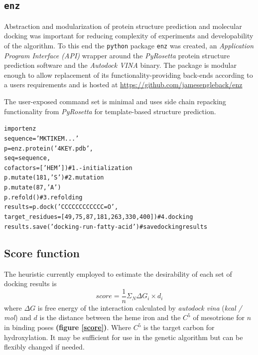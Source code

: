 \documentclass[16pt]{article}
\begin{document}
\subsection{\texttt{enz} \label{enz}}

Abstraction and modularization of protein structure prediction and molecular docking was important for reducing complexity of experiments and developability of the algorithm.
To this end the \texttt{python} package \texttt{enz} was created, an \textit{Application Program Interface (API)} wrapper around the \textit{PyRosetta} \cite{chaudhury2010pyrosetta} protein structure prediction software and the \textit{Autodock VINA} \cite{trott2010autodock} binary.
The package is modular enough to allow replacement of its functionality-providing back-ends according to a users requirements and is hosted at \href{https://github.com/jamesengleback/enz}{https://github.com/jamesengleback/enz}

The user-exposed command set is minimal and uses side chain repacking \cite{dunbrack1993backbone} functionality from \textit{PyRosetta} for template-based structure prediction.

\begin{alltt}
        import enz \\
        sequence = 'MKTIKEM...' \\
        p = enz.protein('4KEY.pdb', 
                        seq=sequence, 
                        cofactors=['HEM']) \# 1. - initialization \\
        p.mutate(181, 'S') \# 2. mutation\\
        p.mutate(87, 'A')\\
        p.refold() \# 3. refolding\\
        results = p.dock('CCCCCCCCCCCC=O', 
                         target\_residues=[49, 75, 87, 181, 263, 330, 400]) \# 4. docking \\
        results.save('docking-run-fatty-acid') \# save docking results
\end{alltt}


\subsection{Score function \label{scorefn}}
The heuristic currently employed to estimate the desirability of each set of docking results is %
\begin{equation}
score = \frac{1}{n}\Sigma _{N} \Delta G_{i} \times d_{i}
\end{equation}
where $ \Delta G $ is free energy of the interaction calculated by \textit{autodock vina} (\textit{kcal / mol}) and $ d $ is the distance between the heme iron and the $C^{5}$ of mesotrione for $ n $ in binding poses \textbf{(figure \ref{score})}. 
Where $C^{5}$ is the target carbon for hydroxylation. 
It may be sufficient for use in the genetic algorithm but can be flexibly changed if needed. %
\end{document}
